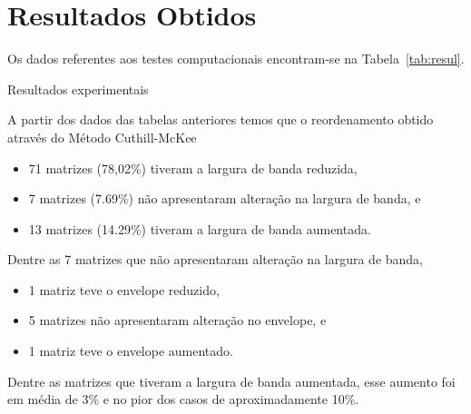 \section{Resultados Obtidos}
Os dados referentes aos testes computacionais encontram-se na
Tabela~\ref{tab:resul}.
\begin{table}
    \centering
    \caption{Resultados experimentais}
    \label{tab:resul}
\end{table}
\begin{table}
    \centering
\end{table}

A partir dos dados das tabelas anteriores temos que o reordenamento obtido
através do Método Cuthill-McKee 
\begin{itemize}
    \item 71 matrizes (78,02\%) tiveram a largura de banda reduzida,
    \item 7 matrizes (7.69\%) não apresentaram alteração na largura de banda, e
    \item 13 matrizes (14.29\%) tiveram a largura de banda aumentada.
\end{itemize}

Dentre as 7 matrizes que não apresentaram alteração na largura de banda,
\begin{itemize}
    \item 1 matriz teve o envelope reduzido,
    \item 5 matrizes não apresentaram alteração no envelope, e
    \item 1 matriz teve o envelope aumentado.
\end{itemize}

Dentre as matrizes que tiveram a largura de banda aumentada, esse aumento foi
em média de 3\% e no pior dos casos de aproximadamente 10\%.
